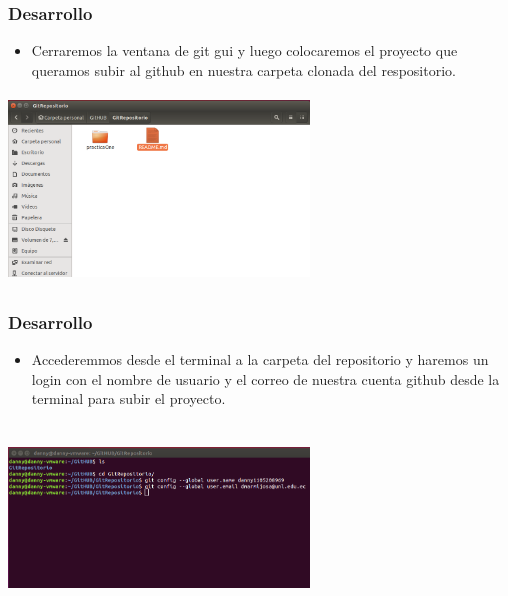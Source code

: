 \documentclass[8pt]{beamer}
\begin{document}
\begin{frame}
\frametitle{Desarrollo}

\setlength{\parskip}{03pt}
\begin{center}
\begin{itemize}
\justifying
\item{Cerraremos la ventana de git gui y luego colocaremos el proyecto que queramos subir al github en nuestra carpeta clonada del respositorio.}\end{itemize} 

\setlength{\parskip}{08pt}
\includegraphics[width=8cm, height=5cm]{img/catorce}
\end{center}
\end{frame}



\begin{frame}
\frametitle{Desarrollo}

\setlength{\parskip}{03pt}
\begin{center}
\begin{itemize}
\justifying
\item{Accederemmos desde el terminal a la carpeta del repositorio y haremos un login con el nombre de usuario y el correo de nuestra cuenta github desde la terminal para subir el proyecto.}\end{itemize} 
\setlength{\parskip}{08pt}
\includegraphics[width=8cm, height=5cm]{img/quince}
\end{center}
\end{frame}
\end{document}
